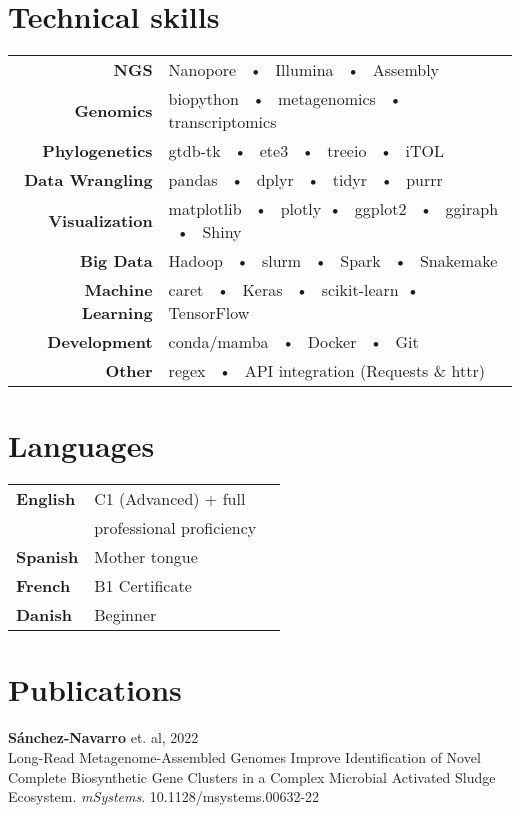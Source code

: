 \documentclass[verylight]{simplehipstercv}
\begin{document}
\begin{paracol}{2}
\section*{Technical skills}
\begin{tabular}{r|p{}}
   \textbf{NGS}           & Nanopore ~•~ Illumina ~•~ Assembly \\
   \textbf{Genomics}      & biopython ~•~ metagenomics ~•~ transcriptomics \\
   \textbf{Phylogenetics}  & gtdb-tk ~•~ ete3 ~•~ treeio ~•~ iTOL \\
   \textbf{Data Wrangling}      & pandas ~•~ dplyr ~•~ tidyr ~•~ purrr \\
   \textbf{Visualization}       & matplotlib ~•~ plotly~•~ ggplot2 ~•~ ggiraph ~•~ Shiny \\
   \textbf{Big Data}            & Hadoop ~•~ slurm ~•~ Spark ~•~ Snakemake \\
   \textbf{Machine Learning}    & caret ~•~ Keras ~•~ scikit-learn~•~ TensorFlow \\
   \textbf{Development}         & conda/mamba ~•~ Docker ~•~ Git \\
   \textbf{Other}               & regex ~•~ API integration (Requests \& httr) \\ 
\end{tabular}

\vspace{1.75em}

\begin{minipage}[t]{0.25\textwidth}


\section*{Languages}
\begin{tabular}{l | ll}
\textbf{English} & C1 (Advanced) + full \\
&  professional proficiency \\
\textbf{Spanish} & {Mother tongue} \\
\textbf{French} & B1 Certificate \\
\textbf{Danish} & Beginner \\
\end{tabular}

\end{minipage}\hfill
\begin{minipage}[t]{0.4\textwidth}
\section*{Publications}
\textbf{Sánchez-Navarro} et. al, 2022 \\ 
Long-Read Metagenome-Assembled Genomes Improve Identification of Novel Complete Biosynthetic Gene Clusters in a Complex Microbial Activated Sludge Ecosystem. \textit{mSystems}. 10.1128/msystems.00632-22 \href{https://doi.org/10.1128/msystems.00632-22}{\faExternalLink}



\end{minipage}
\end{paracol}
\end{document}
